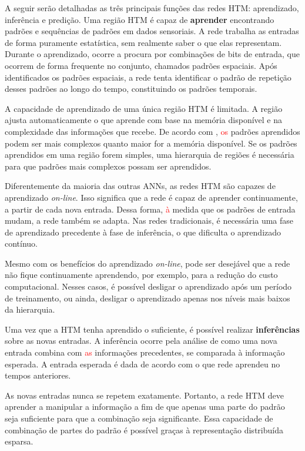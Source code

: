 A seguir serão detalhadas as três principais funções das redes HTM: aprendizado, inferência e predição. Uma região HTM é capaz de \textbf{aprender} encontrando padrões e sequências de padrões em dados sensoriais. A rede trabalha as entradas de forma puramente estatística, sem realmente saber o que elas representam. Durante o aprendizado, ocorre a procura por combinações de bits de entrada, que ocorrem de forma frequente no conjunto, chamados padrões espaciais. Após identificados os padrões espaciais, a rede tenta identificar o padrão de repetição desses padrões ao longo do tempo, constituindo os padrões temporais.

A capacidade de aprendizado de uma única região HTM é limitada. A região ajusta automaticamente o que aprende com base na memória disponível e na complexidade das informações que recebe. De acordo com \numenta, \textcolor{red}{os} padrões aprendidos podem ser mais complexos quanto maior for a memória disponível. Se os padrões aprendidos em uma região forem simples, uma hierarquia de regiões é necessária para que padrões mais complexos possam ser aprendidos.

Diferentemente da maioria das outras ANNs, as redes HTM são capazes de aprendizado \textit{on-line}. Isso significa que a rede é capaz de aprender continuamente, a partir de cada nova entrada. Dessa forma, \textcolor{red}{à} medida que os padrões de entrada mudam, a rede também se adapta. Nas redes tradicionais, é necessária uma fase de aprendizado precedente à fase de inferência, o que dificulta o aprendizado contínuo.

Mesmo com os benefícios do aprendizado \textit{on-line}, pode ser desejável que a rede não fique continuamente aprendendo, por exemplo, para a redução do custo computacional. Nesses casos, é possível desligar o aprendizado após um período de treinamento, ou ainda, desligar o aprendizado apenas nos níveis mais baixos da hierarquia.

Uma vez que a HTM tenha aprendido o suficiente, é possível realizar \textbf{inferências} sobre as novas entradas. A inferência ocorre pela análise de como uma nova entrada combina com \textcolor{red}{as} informações precedentes, se comparada à informação esperada. A entrada esperada é dada de acordo com o que rede aprendeu no tempos anteriores.

As novas entradas nunca se repetem exatamente. Portanto, a rede HTM deve aprender a manipular a informação a fim de que apenas uma parte do padrão seja suficiente para que a combinação seja significante. Essa capacidade de combinação de partes do padrão é possível graças à  representação distribuída esparsa.

